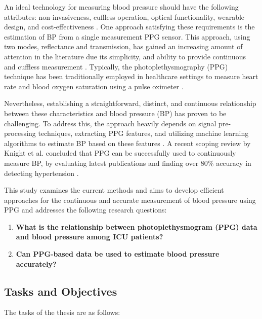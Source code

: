 \documentclass[12pt, bibliography=totoc]{scrartcl}
\begin{document}
An ideal technology for measuring blood pressure should have the following attributes: non-invasiveness, cuffless operation, optical functionality, wearable design, and cost-effectiveness \cite{el-hajjDeepLearningModels2021}.
One approach satisfying these requirements is the estimation of BP from a single measurement PPG sensor.
This approach, using two modes, reflectance and transmission, has gained an increasing amount of attention in the literature due its simplicity, and ability to provide continuous and cuffless measurement \cite{el-hajjDeepLearningModels2021}.
Typically, the photoplethysmography (PPG) technique has been traditionally employed in healthcare settings to measure heart rate \cite{reyesWirelessPhotoplethysmographicDevice2012} and blood oxygen saturation using a pulse oximeter \cite{yoonMultipleDiagnosisBased2002}.

Nevertheless, establishing a straightforward, distinct, and continuous relationship between these characteristics and blood pressure (BP) has proven to be challenging.
To address this, the approach heavily depends on signal pre-processing techniques, extracting PPG features, and utilizing machine learning algorithms to estimate BP based on these features \cite{el-hajjDeepLearningModels2021}.
A recent scoping review by Knight et al. concluded that PPG can be successfully used to continuously measure BP, by evaluating latest publications and finding over 80\% accuracy in detecting hypertension \cite{knightAccuracyWearablePhotoplethysmography2022}.

This study examines the current methods and aims to develop efficient approaches for the continuous and accurate measurement of blood pressure using PPG and addresses the following research questions: 

\begin{enumerate}
\item \textbf{What is the relationship between photoplethysmogram (PPG) data and blood pressure among ICU patients?}

\item \textbf{Can PPG-based data be used to estimate blood pressure accurately?}

\end{enumerate}

\subsection{Tasks and Objectives}
\label{tasks_objectives}

The tasks of the thesis are as follows:
\end{document}
